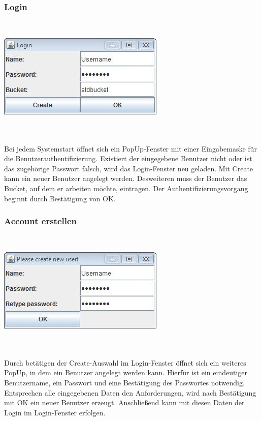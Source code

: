 \documentclass[13pt,a4paper,bibliography=totocnumbered,listof=totocnumbered]{scrartcl}
\begin{document}
\subsubsection{Login}
$\;$\\
\begin{minipage}{\linewidth}
	\centering
	\includegraphics[width=0.4\linewidth]{./img/Login.jpg}
	\label{Login}
\end{minipage}
\\\\Bei jedem Systemstart öffnet sich ein PopUp-Fenster mit einer Eingabemaske für die Benutzerauthentifizierung. Existiert der eingegebene Benutzer nicht oder ist das zugehörige Passwort falsch, wird das Login-Fenster neu geladen. Mit Create kann ein neuer Benutzer angelegt werden. Desweiteren muss der Benutzer das Bucket, auf dem er arbeiten möchte, eintragen. Der Authentifizierungsvorgang beginnt durch Bestätigung von OK.

\subsubsection{Account erstellen}
$\;$\\
\begin{minipage}{\linewidth}
	\centering
	\includegraphics[width=0.4\linewidth]{./img/Create.jpg}
	\label{Create}
\end{minipage}
\\\\Durch betätigen der Create-Auswahl im Login-Fenster öffnet sich ein weiteres PopUp, in dem ein Benutzer angelegt werden kann. Hierfür ist ein eindeutiger Benutzername, ein Passwort und eine Bestätigung des Passwortes notwendig. Entsprechen alle eingegebenen Daten den Anforderungen, wird nach Bestätigung mit OK ein neuer Benutzer erzeugt. Anschließend kann mit diesen Daten der Login im Login-Fenster erfolgen.
\end{document}
